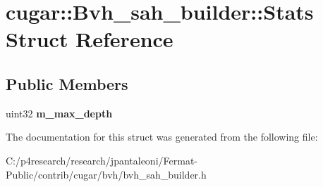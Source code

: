 \hypertarget{structcugar_1_1_bvh__sah__builder_1_1_stats}{}\section{cugar\+:\+:Bvh\+\_\+sah\+\_\+builder\+:\+:Stats Struct Reference}
\label{structcugar_1_1_bvh__sah__builder_1_1_stats}
\subsection*{Public Members}
\begin{DoxyCompactItemize}
\item 
\mbox{\label{structcugar_1_1_bvh__sah__builder_1_1_stats_a44a17664437e839055629eeab3394b4b}} 
uint32 {\bfseries m\+\_\+max\+\_\+depth}
\end{DoxyCompactItemize}


The documentation for this struct was generated from the following file\+:\begin{DoxyCompactItemize}
\item 
C\+:/p4research/research/jpantaleoni/\+Fermat-\/\+Public/contrib/cugar/bvh/bvh\+\_\+sah\+\_\+builder.\+h\end{DoxyCompactItemize}
